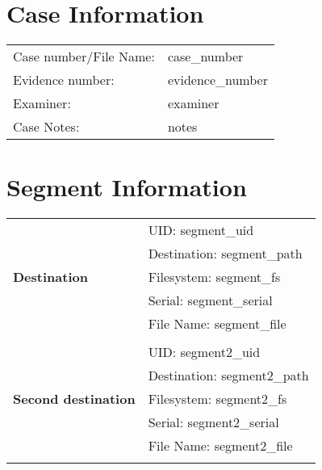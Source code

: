 \documentclass[a4paper,10pt]{article}
\begin{document}
\section*{Case Information}
\vspace{-0.7em}
\begin{tabular}{@{}ll}
Case number/File Name: & {{ case_number }} \\
Evidence number: & {{ evidence_number }} \\
Examiner: & {{ examiner }} \\
Case Notes: & {{ notes }} \\
\end{tabular}


\section*{Segment Information}
\vspace{-0.7em}
\begin{tabular}{@{}l p{7cm}}
    \multirow{5}{*}{\textbf{Destination}} 
        & UID:         \hspace{1em} {{ segment_uid }} \\
    & Destination:    \hspace{1em} {{ segment_path }} \\
    & Filesystem:     \hspace{1em} {{ segment_fs }} \\
    & Serial:         \hspace{1em} {{ segment_serial }} \\
    & File Name:      \hspace{1em} {{ segment_file }} \\
    {%
    \\[-0.5em]
    \multirow{5}{*}{\textbf{Second destination}} 
        & UID:         \hspace{1em} {{ segment2_uid }} \\
    & Destination:    \hspace{1em} {{ segment2_path }} \\
    & Filesystem:     \hspace{1em} {{ segment2_fs }} \\
    & Serial:         \hspace{1em} {{ segment2_serial }} \\
    & File Name:      \hspace{1em} {{ segment2_file }} \\
    {%
\end{tabular}
\end{document}
